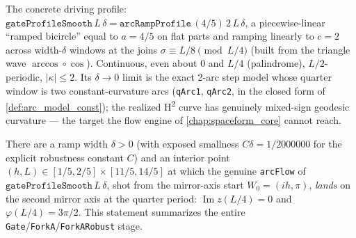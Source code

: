 \begin{definition}
  \label{def:gate_profile_smooth}
  The concrete driving profile: $\texttt{gateProfileSmooth}\,L\,\delta =
  \texttt{arcRampProfile}\,(4/5)\,2\,L\,\delta$, a piecewise-linear ``ramped
  bicircle'' equal to $a=4/5$ on flat parts and ramping linearly to $c=2$
  across width-$\delta$ windows at the joins $\sigma\equiv L/8\pmod{L/4}$
  (built from the triangle wave $\arccos\circ\cos$). Continuous, even about
  $0$ and $L/4$ (palindrome), $L/2$-periodic, $|\kappa|\le2$. Its
  $\delta\to0$ limit is the exact 2-arc step model whose quarter window is two
  constant-curvature arcs (\texttt{qArc1}, \texttt{qArc2}, in the closed form
  of \cref{def:arc_model_const}); the realized H\textsuperscript{2} curve has
  genuinely mixed-sign geodesic curvature — the target the flow engine of
  \cref{chap:spaceform_core} cannot reach.
\end{definition}

\begin{lemma}
  \label{lem:exists_quarter_landing_smooth}
  There are a ramp width $\delta>0$ (with exposed smallness
  $C\delta=1/2000000$ for the explicit robustness constant $C$) and an interior
  point $(h,L)\in[1/5,2/5]\times[11/5,14/5]$ at which the genuine
  \texttt{arcFlow} of $\texttt{gateProfileSmooth}\,L\,\delta$, shot from the
  mirror-axis start $W_0=(ih,\pi)$, \emph{lands} on the second mirror axis at
  the quarter period: $\operatorname{Im}z(L/4)=0$ and $\varphi(L/4)=3\pi/2$.
  This statement summarizes the entire
  \texttt{Gate}/\texttt{ForkA}/\texttt{ForkARobust} stage.
\end{lemma}

